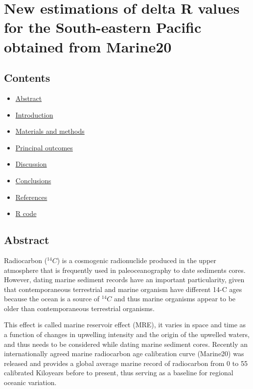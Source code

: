 \documentclass[
]{article}
\author{}
\date{\vspace{-2.5em}}
\providecommand{\tightlist}{%
  \setlength{\itemsep}{0pt}\setlength{\parskip}{0pt}}
\begin{document}
\hypertarget{new-estimations-of-delta-r-values-for-the-south-eastern-pacific-obtained-from-marine20}{%
\section{New estimations of delta R values for the South-eastern Pacific
obtained from
Marine20}\label{new-estimations-of-delta-r-values-for-the-south-eastern-pacific-obtained-from-marine20}}

\hypertarget{contents}{%
\subsection{Contents}\label{contents}}

\begin{itemize}
\tightlist
\item
  \protect\hyperlink{abstract}{Abstract}
\item
  \protect\hyperlink{introduction}{Introduction}
\item
  \protect\hyperlink{materials-and-methods}{Materials and methods}
\item
  \protect\hyperlink{principal-outcomes}{Principal outcomes}
\item
  \protect\hyperlink{ux5cux23discussion}{Discussion}
\item
  \protect\hyperlink{conclusions}{Conclusions}
\item
  \protect\hyperlink{references}{References}
\item
  \protect\hyperlink{r-code}{R code}
\end{itemize}

\hypertarget{abstract}{%
\subsection{Abstract}\label{abstract}}

Radiocarbon (\(^{14}C\)) is a cosmogenic radionuclide produced in the
upper atmosphere that is frequently used in paleoceanography to date
sediments cores. However, dating marine sediment records have an
important particularity, given that contemporaneous terrestrial and
marine organism have different 14-C ages because the ocean is a source
of \(^{14}C\) and thus marine organisms appear to be older than
contemporaneous terrestrial organisms.

This effect is called marine reservoir effect (MRE), it varies in space
and time as a function of changes in upwelling intensity and the origin
of the upwelled waters, and thus needs to be considered while dating
marine sediment cores. Recently an internationally agreed marine
radiocarbon age calibration curve (Marine20) was released and provides a
global average marine record of radiocarbon from 0 to 55 calibrated
Kiloyears before to present, thus serving as a baseline for regional
oceanic variation.
\end{document}
